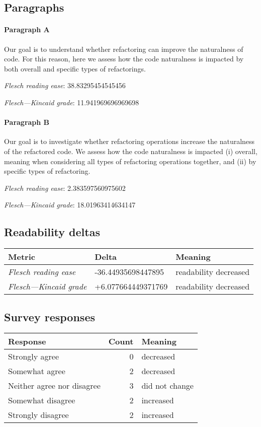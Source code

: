 \subsection{Paragraphs}
\paragraph{Paragraph A}
Our goal is to understand whether refactoring can improve the naturalness of code. For this reason, here we assess how the code naturalness is impacted by both overall and specific types of refactorings.\par\medskip\emph{Flesch reading ease}: 38.83295454545456\par\emph{Flesch---Kincaid grade}: 11.941969696969698

\paragraph{Paragraph B}
Our goal is to investigate whether refactoring operations increase the naturalness of the refactored code. We assess how the code naturalness is impacted (i) overall, meaning when considering all types of refactoring operations together, and (ii) by specific types of refactoring.\par\medskip\emph{Flesch reading ease}: 2.383597560975602\par\emph{Flesch---Kincaid grade}: 18.01963414634147

\subsection{Readability deltas}

\begin{tabular}{lll}
\toprule
               \textbf{Metric} &      \textbf{Delta} &       \textbf{Meaning} \\
\midrule
    \emph{Flesch reading ease} &  -36.44935698447895 &  readability decreased \\
 \emph{Flesch---Kincaid grade} &  +6.077664449371769 &  readability decreased \\
\bottomrule
\end{tabular}

\subsection{Survey responses}
\begin{tabular}{lrl}
\toprule
          \textbf{Response} &  \textbf{Count} & \textbf{Meaning} \\
\midrule
             Strongly agree &               0 &        decreased \\
             Somewhat agree &               2 &        decreased \\
 Neither agree nor disagree &               3 &   did not change \\
          Somewhat disagree &               2 &        increased \\
          Strongly disagree &               2 &        increased \\
\bottomrule
\end{tabular}

